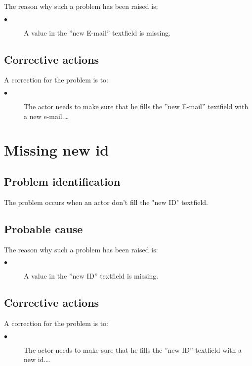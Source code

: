 The reason why such a problem has been raised is:\\
\begin{description}
\item[$\bullet$] A value in the ''new E-mail'' textfield is missing.
\end{description}


\subsection{Corrective actions}

A correction for the problem is to:\\
\begin{description}
\item[$\bullet$] The actor needs to make sure that he fills the
''new E-mail'' textfield with a new e-mail.\ldots

\end{description}




\section{Missing new id} 

\subsection{Problem identification}
The problem occurs when an actor don't fill the "new ID" textfield.

\subsection{Probable cause}

The reason why such a problem has been raised is:\\
\begin{description}
\item[$\bullet$] A value in the ''new ID'' textfield is missing.
\end{description}


\subsection{Corrective actions}

A correction for the problem is to:\\
\begin{description}
\item[$\bullet$] The actor needs to make sure that he fills the
''new ID'' textfield with a new id.\ldots

\end{description}










